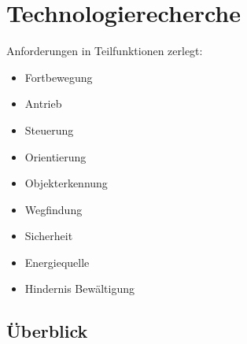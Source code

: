 \newpage
\section{Technologierecherche}

Anforderungen in Teilfunktionen zerlegt:
\begin{itemize}
    \item Fortbewegung
    \item Antrieb
    \item Steuerung
    \item Orientierung
    \item Objekterkennung
    \item Wegfindung
    \item Sicherheit
    \item Energiequelle
    \item Hindernis Bewältigung
\end{itemize}

\subsection*{Überblick}

